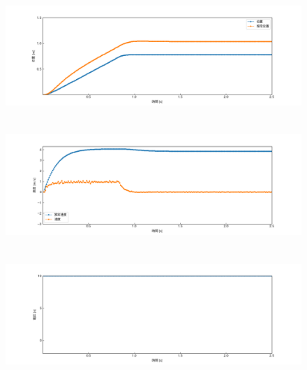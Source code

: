 \documentclass[12pt]{jsarticle}
\begin{document}
\begin{figure}[H]
  \begin{center}
    \includegraphics[clip,width=13.0cm, height=4.4cm]{../img/Exp5-1.png}
    \caption{}
    \label{Exp5-1}
  \end{center}
\end{figure}
\begin{figure}[H]
  \begin{center}
    \includegraphics[clip,width=13.0cm, height=4.4cm]{../img/Exp5-2.png}
    \caption{}
    \label{Exp5-2}
  \end{center}
\end{figure}
\begin{figure}[H]
  \begin{center}
    \includegraphics[clip,width=13.0cm, height=4.4cm]{../img/Exp5-3.png}
    \caption{}
    \label{Exp5-3}
  \end{center}
\end{figure}
\end{document}
